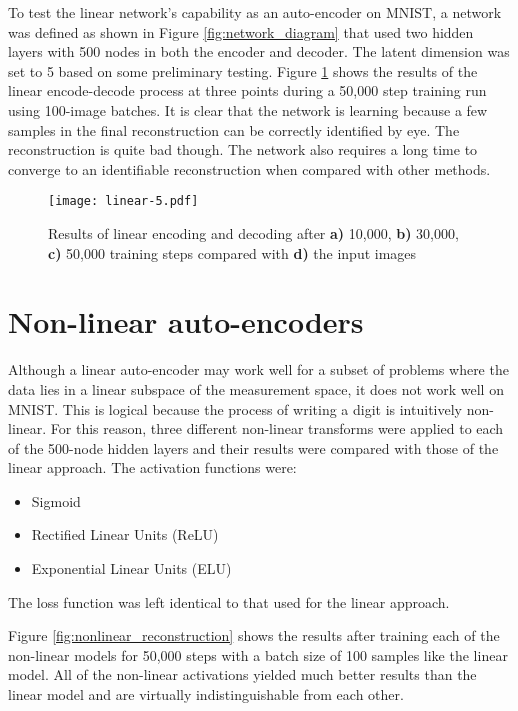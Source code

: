 \documentclass{article}
\begin{document}
To test the linear network's capability as an auto-encoder on MNIST, a network was defined as shown in Figure \ref{fig:network_diagram} that used two hidden layers with 500 nodes in both the encoder and decoder. The latent dimension was set to 5 based on some preliminary testing. Figure \ref{fig:linear_reconstruction} shows the results of the linear encode-decode process at three points during a 50,000 step training run using 100-image batches. It is clear that the network is learning because a few samples in the final reconstruction can be correctly identified by eye. The reconstruction is quite bad though. The network also requires a long time to converge to an identifiable reconstruction when compared with other methods.



\begin{figure}[h]
\label{fig:linear_reconstruction}
\begin{center}
\texttt{[image: linear-5.pdf]} 
\caption{Results of linear encoding and decoding after \textbf{a)} 10,000, \textbf{b)} 30,000, \textbf{c)} 50,000 training steps compared with \textbf{d)} the input images}
\end{center}
\end{figure}

\section{Non-linear auto-encoders}
Although a linear auto-encoder may work well for a subset of problems where the data lies in a linear subspace of the measurement space, it does not work well on MNIST. This is logical because the process of writing a digit is intuitively non-linear. For this reason, three different non-linear transforms were applied to each of the 500-node hidden layers and their results were compared with those of the linear approach. The activation functions were:
\begin{itemize}
\item Sigmoid
\item Rectified Linear Units (ReLU)
\item Exponential Linear Units (ELU)
\end{itemize}
The loss function was left identical to that used for the linear approach. 

Figure \ref{fig:nonlinear_reconstruction} shows the results after training each of the non-linear models for 50,000 steps with a batch size of 100 samples like the linear model. All of the non-linear activations yielded much better results than the linear model and are virtually indistinguishable from each other.
\end{document}
